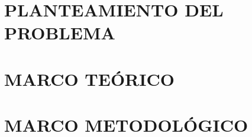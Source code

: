 \documentclass{book}
\begin{document}
\chapter{PLANTEAMIENTO DEL PROBLEMA}
\chapter{MARCO TEÓRICO}
\chapter{MARCO METODOLÓGICO}
\end{document}
